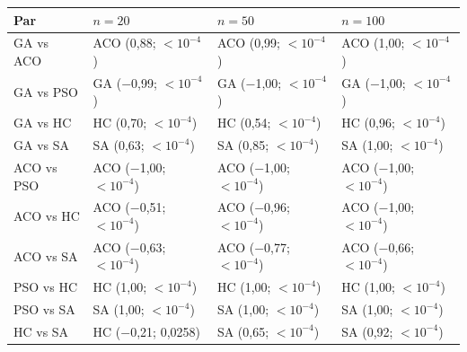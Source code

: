 \begin{tabular}{llll}
\toprule
Par & $n=20$ & $n=50$ & $n=100$ \\
\midrule
GA vs ACO & ACO (0{,}88; $<10^{-4}$) & ACO (0{,}99; $<10^{-4}$) & ACO (1{,}00; $<10^{-4}$) \\
GA vs PSO & GA ($-$0{,}99; $<10^{-4}$) & GA ($-$1{,}00; $<10^{-4}$) & GA ($-$1{,}00; $<10^{-4}$) \\
GA vs HC & HC (0{,}70; $<10^{-4}$) & HC (0{,}54; $<10^{-4}$) & HC (0{,}96; $<10^{-4}$) \\
GA vs SA & SA (0{,}63; $<10^{-4}$) & SA (0{,}85; $<10^{-4}$) & SA (1{,}00; $<10^{-4}$) \\
ACO vs PSO & ACO ($-$1{,}00; $<10^{-4}$) & ACO ($-$1{,}00; $<10^{-4}$) & ACO ($-$1{,}00; $<10^{-4}$) \\
ACO vs HC & ACO ($-$0{,}51; $<10^{-4}$) & ACO ($-$0{,}96; $<10^{-4}$) & ACO ($-$1{,}00; $<10^{-4}$) \\
ACO vs SA & ACO ($-$0{,}63; $<10^{-4}$) & ACO ($-$0{,}77; $<10^{-4}$) & ACO ($-$0{,}66; $<10^{-4}$) \\
PSO vs HC & HC (1{,}00; $<10^{-4}$) & HC (1{,}00; $<10^{-4}$) & HC (1{,}00; $<10^{-4}$) \\
PSO vs SA & SA (1{,}00; $<10^{-4}$) & SA (1{,}00; $<10^{-4}$) & SA (1{,}00; $<10^{-4}$) \\
HC vs SA & HC ($-$0{,}21; 0{,}0258) & SA (0{,}65; $<10^{-4}$) & SA (0{,}92; $<10^{-4}$) \\
\bottomrule
\end{tabular}
